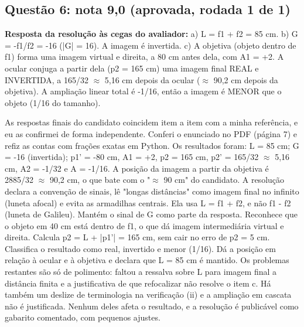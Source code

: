 \documentclass{article}%
\begin{document}
\subsection*{Questão 6: nota 9,0 (aprovada, rodada 1 de 1)}%
\textbf{Resposta da resolução às cegas do avaliador:} a) L = f1 + f2 = 85 cm.\newline%
b) G = -f1/f2 = -16 (|G| = 16). A imagem é invertida.\newline%
c) A objetiva (objeto dentro de f1) forma uma imagem virtual e direita, a 80 cm antes dela, com A1 = +2. A ocular conjuga a partir dela (p2 = 165 cm) uma imagem final REAL e INVERTIDA, a 165/32 $\approx$ 5,16 cm depois da ocular ($\approx$ 90,2 cm depois da objetiva). A ampliação linear total é -1/16, então a imagem é MENOR que o objeto (1/16 do tamanho).\par %
As respostas finais do candidato coincidem item a item com a minha referência, e eu as confirmei de forma independente. Conferi o enunciado no PDF (página 7) e refiz as contas com frações exatas em Python. Os resultados foram: L = 85 cm; G = -16 (invertida); p1' = -80 cm, A1 = +2, p2 = 165 cm, p2' = 165/32 $\approx$ 5,16 cm, A2 = -1/32 e A = -1/16. A posição da imagem a partir da objetiva é 2885/32 $\approx$ 90,2 cm, o que bate com o "$\approx$ 90 cm" do candidato. A resolução declara a convenção de sinais, lê "longas distâncias" como imagem final no infinito (luneta afocal) e evita as armadilhas centrais. Ela usa L = f1 + f2, e não f1 - f2 (luneta de Galileu). Mantém o sinal de G como parte da resposta. Reconhece que o objeto em 40 cm está dentro de f1, o que dá imagem intermediária virtual e direita. Calcula p2 = L + |p1'| = 165 cm, sem cair no erro de p2 = 5 cm. Classifica o resultado como real, invertido e menor (1/16). Dá a posição em relação à ocular e à objetiva e declara que L = 85 cm é mantido. Os problemas restantes são só de polimento: faltou a ressalva sobre L para imagem final a distância finita e a justificativa de que refocalizar não resolve o item c. Há também um deslize de terminologia na verificação (ii) e a ampliação em cascata não é justificada. Nenhum deles afeta o resultado, e a resolução é publicável como gabarito comentado, com pequenos ajustes.%
\end{document}
